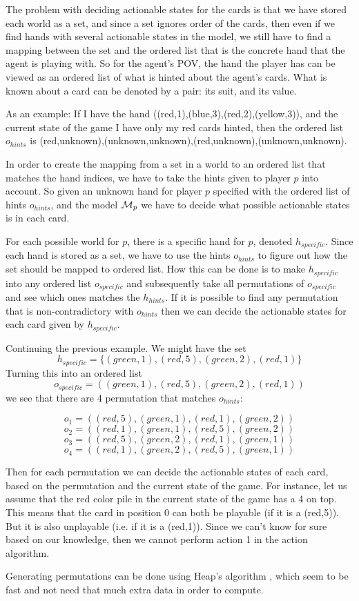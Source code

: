 The problem with deciding actionable states for the cards is that we have stored each world as a set, and since a set ignores order of the cards, then even if we find hands with several actionable states in the model, we still have to find a mapping between the set and the ordered list that is the concrete hand that the agent is playing with.
So for the agent's POV, the hand the player has can be viewed as an ordered list of what is hinted about the agent's cards. What is known about a card can be denoted by a pair: its suit, and its value. 

As an example: If I have the hand ((red,1),(blue,3),(red,2),(yellow,3)), and the current state of the game I have only my red cards hinted, then the ordered list $o_{hints}$ is (red,unknown),(unknown,unknown),(red,unknown),(unknown,unknown).

In order to create the mapping from a set in a world to an ordered list that matches the hand indices, we have to take the hints given to player $p$ into account.
So given an unknown hand for player $p$ specified with the ordered list of hints $o_{hints}$, and the model $\mathcal{M}_p$ we have to decide what possible actionable states is in each card. 

For each possible world for $p$, there is a specific hand for $p$, denoted $h_{specific}$. Since each hand is stored as a set, we have to use the hints $o_{hints}$ to figure out how the set should be mapped to ordered list. How this can be done is to make $h_{specific}$ into any ordered list $o_{specific}$ and subsequently take all permutations of $o_{specific}$ and see which ones matches the $h_{hints}$. If it is possible to find any permutation that is non-contradictory with $o_{hints}$ then we can decide the actionable states for each card given by $h_{specific}$.

Continuing the previous example. We might have the set \[h_{specific} = \{(green,1),(red,5),(green,2),(red,1)\}\]
Turning this into an ordered list 
\[o_{specific} = ((green,1),(red,5),(green,2),(red,1))\]
we see that there are 4 permutation that matches $o_{hints}$:

\[o_{1} = ((red,5),(green,1),(red,1),(green,2))\]
\[o_{2} = ((red,1),(green,1),(red,5),(green,2))\]
\[o_{3} = ((red,5),(green,2),(red,1),(green,1))\]
\[o_{4} = ((red,1),(green,2),(red,5),(green,1))\]

Then for each permutation we can decide the actionable states of each card, based on the permutation and the current state of the game. For instance, let us assume that the red color pile in the current state of the game has a 4 on top. This means that the card in position 0 can both be playable (if it is a (red,5)). But it is also unplayable (i.e. if it is a (red,1)). Since we can't know for sure based on our knowledge, then we cannot perform action 1 in the action algorithm.

Generating permutations can be done using Heap's algorithm \cite{wiki:heapsalgorithm}, which seem to be fast and not need that much extra data in order to compute. 

